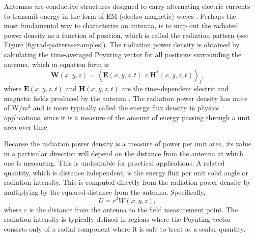 Antennas are conductive structures designed to carry alternating electric currents to transmit energy in the form of EM (electro-magnetic) waves \cite{balanis2015antenna}. Perhaps the most fundamental way to characterize an antenna, is to map out the radiated power density as a function of position, which is called the radiation pattern (see Figure \ref{fig:rad-pattern-examples}). The radiation power density is obtained by calculating the time-averaged Poynting vector for all positions surrounding the antenna, which in equation form is
\begin{equation}
    \mathbf{W}(x,y,z) = \left<\mathbf{E}(x,y,z,t)\times\mathbf{H}^\ast(x,y,z,t)\right>_t,
\end{equation}
where $\mathbf{E}(x,y,z,t)$ and $\mathbf{H}(x,y,z,t)$ are the time-dependent electric and magnetic fields produced by the antenna \cite{jackson_classical_1999}. The radiation power density has units of $\mathrm{W}/\mathrm{m}^2$ and is more typically called the energy flux density in physics applications, since it is a measure of the amount of energy passing through a unit area over time. 

Because the radiation power density is a measure of power per unit area, its value in a particular direction will depend on the distance from the antenna at which one is measuring. This is undesirable for practical applications. A related quantity, which is distance independent, is the energy flux per unit solid angle or radiation intensity. This is computed directly from the radiation power density by multiplying by the squared distance from the antenna. Specifically,
\begin{equation}
    U = r^2W(x,y,z),
\end{equation}
where $r$ is the distance from the antenna to the field measurement point. The radiation intensity is typically defined in regions where the Poynting vector consists only of a radial component where it is safe to treat as a scalar quantity. 

